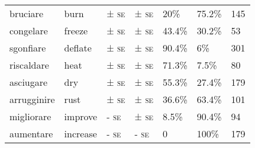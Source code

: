 \documentclass[output=paper,colorlinks,citecolor=brown
]{langscibook}
\begin{document}
\begin{table}[hbt!]
{\begin{tabular}{|p{}|p{}||p{}|p{}||p{}|p{}||p{}|}
bruciare     & burn      & ± \textsc{se}                                                                                     & ± \textsc{se}                                                                          & 20\%                              & 75.2\%                                    & 145                 \\
congelare    & freeze    & ± \textsc{se}                                                                                     & ± \textsc{se}                                                                          & 43.4\%                            & 30.2\%                                    & 53                  \\
sgonfiare    & deflate   & ± \textsc{se}                                                                                     & ± \textsc{se}                                                                          & 90.4\%                            & 6\%                                       & 301                 \\
riscaldare   & heat      & ± \textsc{se}                                                                                     & ± \textsc{se}                                                                          & 71.3\%                            & 7.5\%                                     & 80                  \\
asciugare    & dry       & ± \textsc{se}                                                                                     & ± \textsc{se}                                                                          & 55.3\%                            & 27.4\%                                    & 179                 \\
arrugginire  & rust      & ± \textsc{se}                                                                                     & ± \textsc{se}                                                                          & 36.6\%                            & 63.4\%                                    & 101                 \\
migliorare   & improve   & - \textsc{se}                                                                                     & \cellcolor[HTML]{BFBFBF}± \textsc{se}                                                  & 8.5\%                             & 90.4\%                                    & 94                  \\
aumentare    & increase   & - \textsc{se}                                                                                     & - \textsc{se}                                                                          & 0                                 & 100\%                                     & 179                 \\

\end{tabular}}
\end{table}
\end{document}
